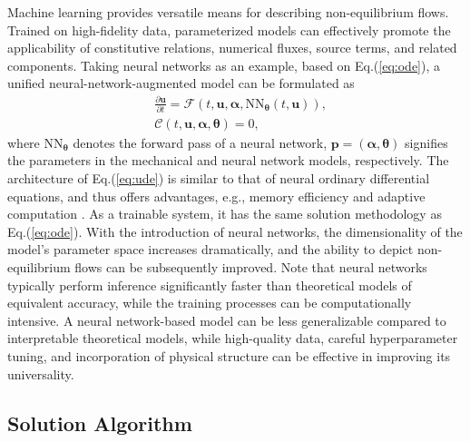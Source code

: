 \documentclass[preprint,3p,12pt,sort&compress]{elsarticle}
\begin{document}
Machine learning provides versatile means for describing non-equilibrium flows.
Trained on high-fidelity data,
parameterized models can effectively promote the applicability of constitutive relations, numerical fluxes, source terms, and related components.
Taking neural networks as an example, based on Eq.(\ref{eq:ode}), a unified neural-network-augmented model can be formulated as
\begin{equation}
\begin{aligned}
    &\frac{\partial \mathbf u}{\partial t}=\mathcal F(t, \mathbf u, \boldsymbol\alpha, \mathrm{NN}_{\boldsymbol\theta}(t,\mathbf u)), \\
    &\mathcal C(t,\mathbf u,\boldsymbol\alpha,\boldsymbol\theta)=0,
\end{aligned}
\label{eq:ude}
\end{equation}
where $\mathrm{NN}_{\boldsymbol\theta}$ denotes the forward pass of a neural network, $\mathbf p=(\boldsymbol\alpha,\boldsymbol\theta)$ signifies the parameters in the mechanical and neural network models, respectively.
The architecture of Eq.(\ref{eq:ude}) is similar to that of neural ordinary differential equations, and thus offers advantages, e.g., memory efficiency and adaptive computation \cite{chen2018neural}.
As a trainable system, it has the same solution methodology as Eq.(\ref{eq:ode}).
With the introduction of neural networks, the dimensionality of the model's parameter space increases dramatically, and the ability to depict non-equilibrium flows can be subsequently improved.
Note that neural networks typically perform inference significantly faster than theoretical models of equivalent accuracy, while the training processes can be computationally intensive.
A neural network-based model can be less generalizable compared to interpretable theoretical models, while high-quality data, careful hyperparameter tuning, and incorporation of physical structure can be effective in improving its universality.

\subsection{Solution Algorithm}
\end{document}
